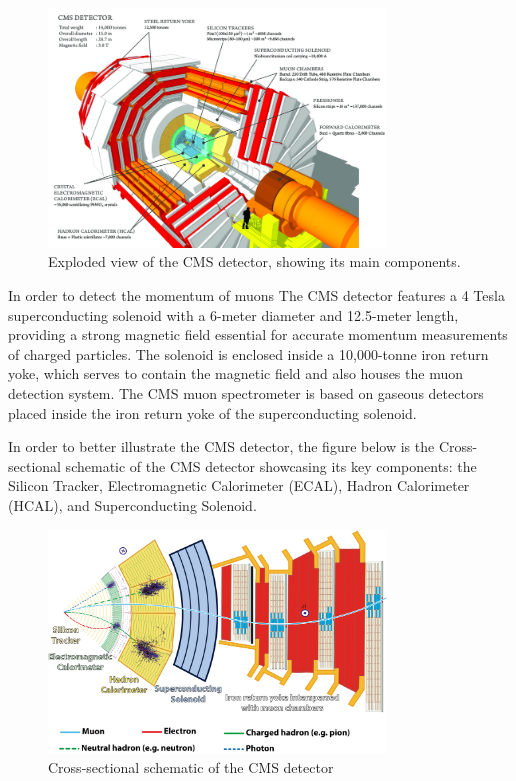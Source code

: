 \begin{figure}[ht]
    \centering
    \includegraphics[width=0.8\textwidth]{Figures/CMS Detector Schematic.png} %
    \caption{Exploded view of the CMS detector, showing its main components.}
    \label{fig:cms_detector}
\end{figure}

In order to detect the momentum of muons  The CMS detector features a 4 Tesla superconducting solenoid with a 6-meter diameter and 12.5-meter length, providing a strong magnetic field essential for accurate momentum measurements of charged particles. The solenoid is enclosed inside a 10,000-tonne iron return yoke, which serves to contain the magnetic field and also houses the muon detection system.\cite{superconducting_magnet} The CMS muon spectrometer is based on gaseous detectors placed inside the iron return yoke of the superconducting solenoid.\cite{4436524}

In order to better illustrate the CMS detector, the figure below is the Cross-sectional schematic of the CMS detector showcasing its key components: the Silicon Tracker, Electromagnetic Calorimeter (ECAL), Hadron Calorimeter (HCAL), and Superconducting Solenoid.

\begin{figure}[ht]
    \centering
    \includegraphics[width=0.8\textwidth]{Figures/CMS Slice White Background.png} %
    \caption{Cross-sectional schematic of the CMS detector}
    \label{fig:cms_tracker}
\end{figure}

